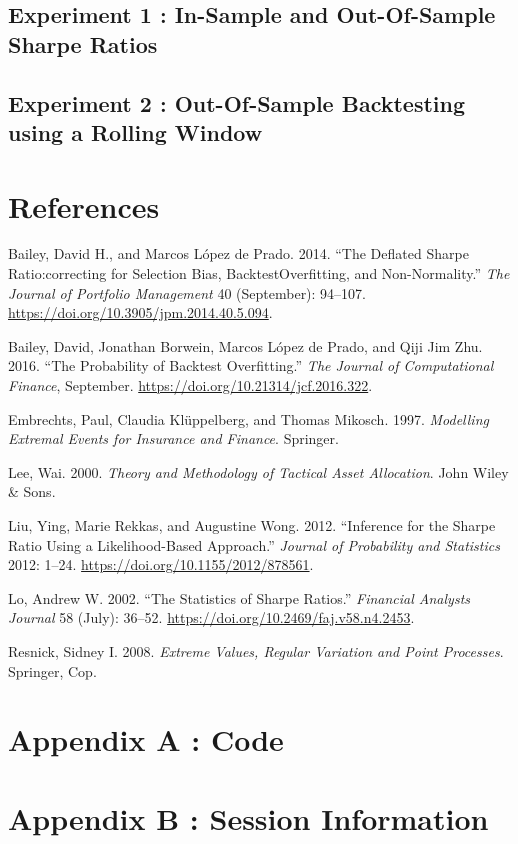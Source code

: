 \documentclass[
  12pt,
]{article}
\newlength{\cslhangindent}
\newenvironment{CSLReferences}[2] %
 {\begin{list}{}{%
  \setlength{\itemindent}{0pt}
  \setlength{\leftmargin}{0pt}
  \setlength{\parsep}{0pt}
  \ifodd #1
   \setlength{\leftmargin}{\cslhangindent}
   \setlength{\itemindent}{-1\cslhangindent}
  \fi
  \setlength{\itemsep}{#2\baselineskip}}}
 {\end{list}}
\begin{document}
\subsection{Experiment 1 : In-Sample and Out-Of-Sample Sharpe
Ratios}\label{experiment-1-in-sample-and-out-of-sample-sharpe-ratios}

\subsection{Experiment 2 : Out-Of-Sample Backtesting using a Rolling
Window}\label{experiment-2-out-of-sample-backtesting-using-a-rolling-window}

\newpage

\section{References}\label{references}

\label{refs}
\begin{CSLReferences}{1}{0}
Bailey, David H., and Marcos López de Prado. 2014. {``The Deflated
Sharpe Ratio:correcting for Selection Bias, BacktestOverfitting, and
Non-Normality.''} \emph{The Journal of Portfolio Management} 40
(September): 94--107. \url{https://doi.org/10.3905/jpm.2014.40.5.094}.

Bailey, David, Jonathan Borwein, Marcos López de Prado, and Qiji Jim
Zhu. 2016. {``The Probability of Backtest Overfitting.''} \emph{The
Journal of Computational Finance}, September.
\url{https://doi.org/10.21314/jcf.2016.322}.

Embrechts, Paul, Claudia Klüppelberg, and Thomas Mikosch. 1997.
\emph{Modelling Extremal Events for Insurance and Finance}. Springer.

Lee, Wai. 2000. \emph{Theory and Methodology of Tactical Asset
Allocation}. John Wiley \& Sons.

Liu, Ying, Marie Rekkas, and Augustine Wong. 2012. {``Inference for the
Sharpe Ratio Using a Likelihood-Based Approach.''} \emph{Journal of
Probability and Statistics} 2012: 1--24.
\url{https://doi.org/10.1155/2012/878561}.

Lo, Andrew W. 2002. {``The Statistics of Sharpe Ratios.''}
\emph{Financial Analysts Journal} 58 (July): 36--52.
\url{https://doi.org/10.2469/faj.v58.n4.2453}.

Resnick, Sidney I. 2008. \emph{Extreme Values, Regular Variation and
Point Processes}. Springer, Cop.

\end{CSLReferences}

\newpage

\section{Appendix A : Code}\label{appendix-a-code}

\section{Appendix B : Session
Information}\label{appendix-b-session-information}
\end{document}
